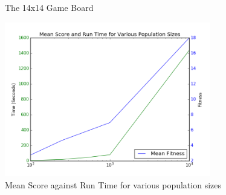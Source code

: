 \documentclass{article}
\begin{document}
\begin{figure}[ht]
\caption{The 14x14 Game Board}
\label{fig:game_board}
\end{figure}

\begin{figure}[ht]
\centering
\includegraphics[width=0.8\textwidth]{Figures/meanscore_v_runtime}
\caption{Mean Score against Run Time for various population sizes}
\label{fig:meanscore_v_runtime}
\end{figure}
\end{document}
